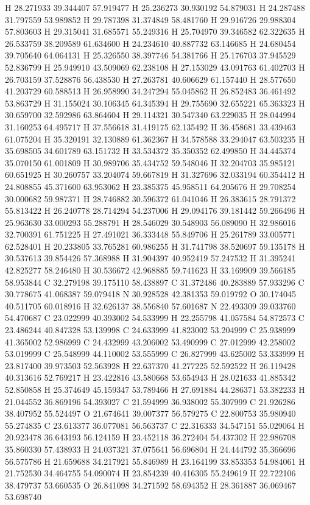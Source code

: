 \documentclass{article}
\begin{document}
H 28.271933 39.344407 57.919477 
H 25.236273 30.930192 54.879031 
H 24.287488 31.797559 53.989852 
H 29.787398 31.374849 58.481760 
H 29.916726 29.988304 57.803603 
H 29.315041 31.685571 55.249316 
H 25.704970 39.346582 62.322635 
H 26.533759 38.209589 61.634600 
H 24.234610 40.887732 63.146685 
H 24.680454 39.705640 64.064131 
H 25.326550 38.397746 54.381766 
H 25.176703 37.945529 52.836799 
H 25.949910 43.509069 62.238108 
H 27.153029 43.091763 61.402703 
H 26.703159 37.528876 56.438530 
H 27.263781 40.606629 61.157440 
H 28.577650 41.203729 60.588513 
H 26.958990 34.247294 55.045862 
H 26.852483 36.461492 53.863729 
H 31.155024 30.106345 64.345394 
H 29.755690 32.655221 65.363323 
H 30.659700 32.592986 63.864604 
H 29.114321 30.547340 63.229035 
H 28.044994 31.160253 64.495717 
H 37.556618 31.419175 62.135492 
H 36.458681 33.439463 61.075204 
H 35.320191 32.130889 61.362367 
H 34.578588 33.294047 63.503235 
H 35.698505 34.601789 63.151732 
H 33.534372 35.350352 62.499850 
H 34.445374 35.070150 61.001809 
H 30.989706 35.434752 59.548046 
H 32.204703 35.985121 60.651925 
H 30.260757 33.204074 59.667819 
H 31.327696 32.033194 60.354412 
H 24.808855 45.371600 63.953062 
H 23.385375 45.958511 64.205676 
H 29.708254 30.000682 59.987371 
H 28.746882 30.596372 61.041046 
H 26.383615 28.791372 55.813422 
H 26.240778 28.714294 54.237006 
H 29.094176 39.181442 59.266496 
H 25.963630 33.000293 55.288791 
H 28.546029 30.548903 56.089090 
H 32.986016 32.700391 61.751225 
H 27.491021 36.333448 55.849706 
H 25.261789 33.005771 62.528401 
H 20.233805 33.765281 60.986255 
H 31.741798 38.520697 59.135178 
H 30.537613 39.854426 57.368988 
H 31.904397 40.952419 57.247532 
H 31.395241 42.825277 58.246480 
H 30.536672 42.968885 59.741623 
H 33.169909 39.566185 58.953844 
C 32.279198 39.175110 58.438897 
C 31.372486 40.283889 57.933296 
C 30.778675 41.068387 59.079418 
N 30.928528 42.381353 59.019792 
O 30.174045 40.511705 60.018916 
H 32.626137 38.556840 57.601687 
N 22.493309 39.033760 54.470687 
C 23.022999 40.393002 54.533999 
H 22.255798 41.057584 54.872573 
C 23.486244 40.847328 53.139998 
C 24.633999 41.823002 53.204999 
C 25.938999 41.365002 52.986999 
C 24.432999 43.206002 53.490999 
C 27.012999 42.258002 53.019999 
C 25.548999 44.110002 53.555999 
C 26.827999 43.625002 53.333999 
H 23.817400 39.973503 52.563928 
H 22.637370 41.277225 52.592522 
H 26.119428 40.313616 52.769217 
H 23.422816 43.580668 53.654943 
H 28.021633 41.885342 52.850858 
H 25.374649 45.159347 53.789466 
H 27.691884 44.286371 53.382233 
H 21.044552 36.869196 54.393027 
C 21.594999 36.938002 55.307999 
C 21.926286 38.407952 55.524497 
O 21.674641 39.007377 56.579275 
C 22.800753 35.980940 55.274835 
C 23.613377 36.077081 56.563737 
C 22.316333 34.547151 55.029064 
H 20.923478 36.643193 56.124159 
H 23.452118 36.272404 54.437302 
H 22.986708 35.860330 57.438933 
H 24.037321 37.075641 56.696804 
H 24.444792 35.366696 56.575786 
H 21.659688 34.217921 55.846989 
H 23.164199 33.853353 54.984061 
H 21.752530 34.464755 54.090074 
H 23.854239 40.416305 55.249619 
H 22.722106 38.479737 53.660535 
O 26.841098 34.271592 58.694352 
H 28.361887 36.069467 53.698740 
~     
\end{document}
